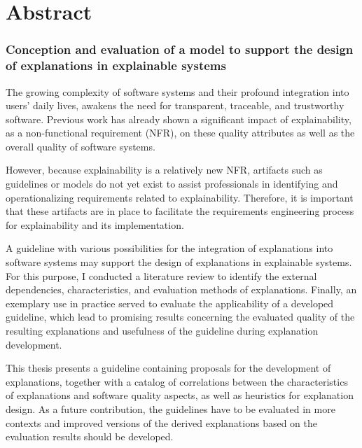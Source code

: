 \clearpage

\chapter*{Abstract}

\subsection*{Conception and evaluation of a model to support the design of explanations in explainable systems}

The growing complexity of software systems and their profound integration into users’ daily lives, awakens the need for transparent, traceable, and trustworthy software. Previous work  has already shown a significant impact of explainability, as a non-functional requirement (NFR), on these quality attributes as well as the overall quality of software systems.

However, because explainability is a relatively new NFR, artifacts such as guidelines or models do not yet exist to assist professionals in identifying and operationalizing requirements related to explainability. Therefore, it is important that these artifacts are in place to facilitate the requirements engineering process for explainability and its implementation.

A guideline with various possibilities for the integration of explanations into software systems may support the design of explanations in explainable systems. For this purpose, I conducted a literature review to identify the external dependencies, characteristics, and evaluation methods of explanations. Finally, an exemplary use in practice served to evaluate the applicability of a developed guideline, which lead to promising results concerning the evaluated quality of the resulting explanations and usefulness of the guideline during explanation development.

This thesis presents a guideline containing proposals for the development of explanations, together with a catalog of correlations between the characteristics of explanations and software quality aspects, as well as heuristics for explanation design. As a future contribution, the guidelines have to be evaluated in more contexts and improved versions of the derived explanations based on the evaluation results should be developed.

\clearpage